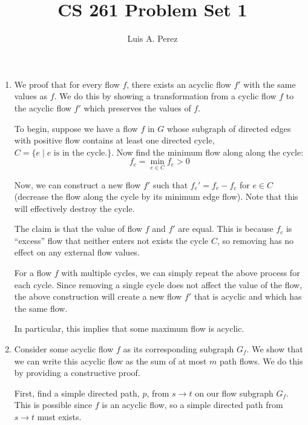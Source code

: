 \documentclass[12pt]{exam}
\newcommand*{\authorname}{Luis A. Perez}
\newcommand{\Q}[1]{\question{\large{\textbf{#1}}}}
\begin{document}
\title{CS 261 Problem Set 1}
\author{\authorname}
\date{}
\maketitle
\thispagestyle{headandfoot}
\setcounter{MaxMatrixCols}{15}

\begin{questions}
\Q{Problem 1}
\begin{solution}
  \begin{enumerate}[label=(\alph*)]
    \item
      We proof that for every flow $f$, there exists an acyclic flow $f'$ with the same values as $f$. We do this by showing a transformation from a cyclic flow $f$ to the acyclic flow $f'$ which preserves the values of $f$.

      To begin, suppose we have a flow $f$ in $G$ whose subgraph of directed edges with positive flow contains at least one directed cycle, $C = \{e \mid e \text{ is in the cycle.} \}$. Now find the minimum flow along along the cycle:
      \[
        f_c = \min_{e \in C} f_e > 0
      \]

      Now, we can construct a new flow $f'$ such that $f_e' = f_e - f_c$ for $e \in C$ (decrease the flow along the cycle by its minimum edge flow). Note that this will effectively destroy the cycle.

      The claim is that the value of flow $f$ and $f'$ are equal. This is because $f_c$ is ``excess'' flow that neither enters not exists the cycle $C$, so removing has no effect on any external flow values. 

      For a flow $f$ with multiple cycles, we can simply repeat the above process for each cycle. Since removing a single cycle does not affect the value of the flow, the above construction will create a new flow $f'$ that is acyclic and which has the same flow.

      In particular, this implies that some maximum flow is acyclic.

    \item
      Consider some acyclic flow $f$ as its corresponding subgraph $G_f$. We show that we can write this acyclic flow as the sum of at most $m$ path flows. We do this by providing a constructive proof.

      First, find a simple directed path, $p$, from $s \to t$ on our flow subgraph $G_f$. This is possible since $f$ is an acyclic flow, so a simple directed path from $s \to t$ must exists.


\end{enumerate}
\end{solution}
\end{questions}
\end{document}
